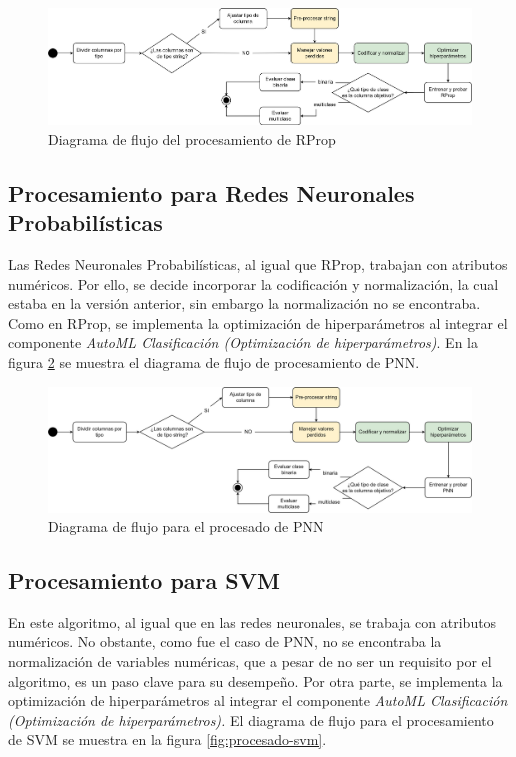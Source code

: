  \begin{figure}[H]
	\centering
	\includegraphics[width=1\linewidth]{"figuras/capi 2/modelos/procesado rprop.drawio"}
	\caption{Diagrama de flujo del procesamiento de RProp}
	\label{fig:procesado-rprop}
\end{figure}



\subsection{Procesamiento para Redes Neuronales Probabilísticas}
Las Redes Neuronales Probabilísticas, al igual que RProp, trabajan con atributos numéricos. Por ello, se decide incorporar la codificación y normalización, la cual estaba en la versión anterior, sin embargo la normalización no se encontraba. Como en RProp, se implementa la optimización de hiperparámetros al integrar el componente \textit{AutoML Clasificación (Optimización de hiperparámetros)}. En la figura \ref{fig:procesado-pnn} se muestra el diagrama de flujo de procesamiento de PNN.

\begin{figure}[H]
	\centering
	\includegraphics[width=1\linewidth]{"figuras/capi 2/modelos/procesado pnn.drawio"}
	\caption{Diagrama de flujo para el procesado de PNN}
	\label{fig:procesado-pnn}
\end{figure}


\subsection{Procesamiento para SVM}
En este algoritmo, al igual que en las redes neuronales, se trabaja con atributos numéricos. No obstante, como fue el caso de PNN, no se encontraba la normalización de variables numéricas, que a pesar de no ser un requisito por el algoritmo, es un paso clave para su desempeño. Por otra parte, se implementa la optimización de hiperparámetros al integrar el componente \textit{AutoML Clasificación (Optimización de hiperparámetros).} El diagrama de flujo para el procesamiento de SVM se muestra en la figura \ref{fig:procesado-svm}.

